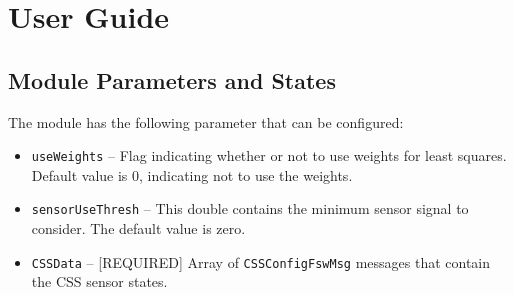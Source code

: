 
\section{User Guide}

\subsection{Module Parameters and States}
The module has the following parameter that can be configured:
\begin{itemize}
	\item {\tt useWeights} -- Flag indicating whether or not to use weights for least squares.  Default value is 0, indicating not to use the weights.
	
	\item {\tt sensorUseThresh} -- This double contains the minimum sensor signal to consider.     The default value is zero. 
	
	\item {\tt CSSData} -- [REQUIRED] Array of {\tt CSSConfigFswMsg} messages that contain the CSS sensor states.	
\end{itemize}

